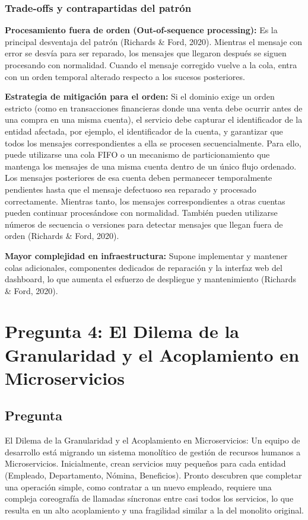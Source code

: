 \documentclass[12pt, a4paper]{article}
\begin{document}
    \subsubsection{Trade-offs y contrapartidas del patrón}
    \textbf{Procesamiento fuera de orden (Out-of-sequence processing):} Es la principal desventaja del patrón (Richards \& Ford, 2020). Mientras el mensaje con error se desvía para ser reparado, los mensajes que llegaron después se siguen procesando con normalidad. Cuando el mensaje corregido vuelve a la cola, entra con un orden temporal alterado respecto a los sucesos posteriores.

    \textbf{Estrategia de mitigación para el orden:} Si el dominio exige un orden estricto (como en transacciones financieras donde una venta debe ocurrir antes de una compra en una misma cuenta), el servicio debe capturar el identificador de la entidad afectada, por ejemplo, el identificador de la cuenta, y garantizar que todos los mensajes correspondientes a ella se procesen secuencialmente. Para ello, puede utilizarse una cola FIFO o un mecanismo de particionamiento que mantenga los mensajes de una misma cuenta dentro de un único flujo ordenado. Los mensajes posteriores de esa cuenta deben permanecer temporalmente pendientes hasta que el mensaje defectuoso sea reparado y procesado correctamente. Mientras tanto, los mensajes correspondientes a otras cuentas pueden continuar procesándose con normalidad. También pueden utilizarse números de secuencia o versiones para detectar mensajes que llegan fuera de orden (Richards \& Ford, 2020).

    \textbf{Mayor complejidad en infraestructura:} Supone implementar y mantener colas adicionales, componentes dedicados de reparación y la interfaz web del dashboard, lo que aumenta el esfuerzo de despliegue y mantenimiento (Richards \& Ford, 2020).
    \section[El Dilema de la Granularidad y el Acoplamiento en Microservicios]{Pregunta 4: El Dilema de la Granularidad y el Acoplamiento en Microservicios}

    \subsection{Pregunta}

    El Dilema de la Granularidad y el Acoplamiento en Microservicios: Un equipo de desarrollo está migrando un sistema monolítico de gestión de recursos humanos a Microservicios. Inicialmente, crean servicios muy pequeños para cada entidad (Empleado, Departamento, Nómina, Beneficios). Pronto descubren que completar una operación simple, como contratar a un nuevo empleado, requiere una compleja coreografía de llamadas síncronas entre casi todos los servicios, lo que resulta en un alto acoplamiento y una fragilidad similar a la del monolito original.
\end{document}

